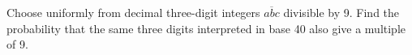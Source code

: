 Choose uniformly from decimal three-digit integers $\overline{abc}$ divisible by 9. Find the probability that the same three digits interpreted in base 40 also give a multiple of 9.
